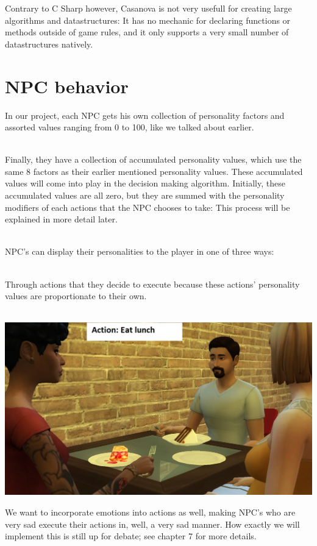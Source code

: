 \documentclass[11pt]{article} %
\begin{document}
Contrary to C Sharp however, Casanova is not very usefull for creating large algorithms and datastructures: It has no mechanic for declaring functions or methods outside of game rules, and it only supports a very small number of datastructures natively. 

\newpage
\section{NPC behavior}
In our project, each NPC gets his own collection of personality factors and assorted values ranging from 0 to 100, like we talked about earlier. 

~\\
Finally, they have a collection of accumulated personality values, which use the same 8 factors as their earlier mentioned personality values. These accumulated values will come into play in the decision making algorithm. Initially, these accumulated values are all zero, but they are summed with the personality modifiers of each actions that the NPC chooses to take: This process will be explained in more detail later.

~\\
NPC's can display their personalities to the player in one of three ways:

~\\
Through actions that they decide to execute because these actions' personality values are proportionate to their own.

~\\
\includegraphics[scale=0.4]{SimsEating}


\newpage
We want to incorporate emotions into actions as well, making NPC's who are very sad execute their actions in, well, a very sad manner. How exactly we will implement this is still up for debate; see chapter 7 for more details.
~\\
\end{document}
